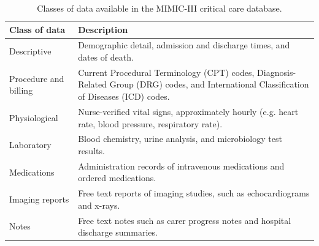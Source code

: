 \documentclass[english]{article}
\begin{document}
\begin{center}
\begin{table}
\begin{tabular}{|l|p{8cm}|}
    \hline
    Class of data & Description \\ 
    \hline
    Descriptive & Demographic detail, admission and discharge times, and dates of death. \\ 
    \hline
    Procedure and billing & Current Procedural Terminology (CPT) codes, Diagnosis-Related Group (DRG) codes, and International Classification of Diseases (ICD) codes. \\ 
    \hline
    Physiological & Nurse-verified vital signs, approximately hourly (e.g. heart rate, blood pressure, respiratory rate). \\ 
    \hline
    Laboratory & Blood chemistry, urine analysis, and microbiology test results. \\ 
    \hline
    Medications & Administration records of intravenous medications and ordered medications. \\ 
    \hline
    Imaging reports & Free text reports of imaging studies, such as echocardiograms and x-rays. \\ 
    \hline
    Notes & Free text notes such as carer progress notes and hospital discharge summaries. \\ 
    \hline
\end{tabular}
\caption{Classes of data available in the MIMIC-III critical care database.}
\label{table:dataclasses}
\end{table}
\end{center}
\end{document}
